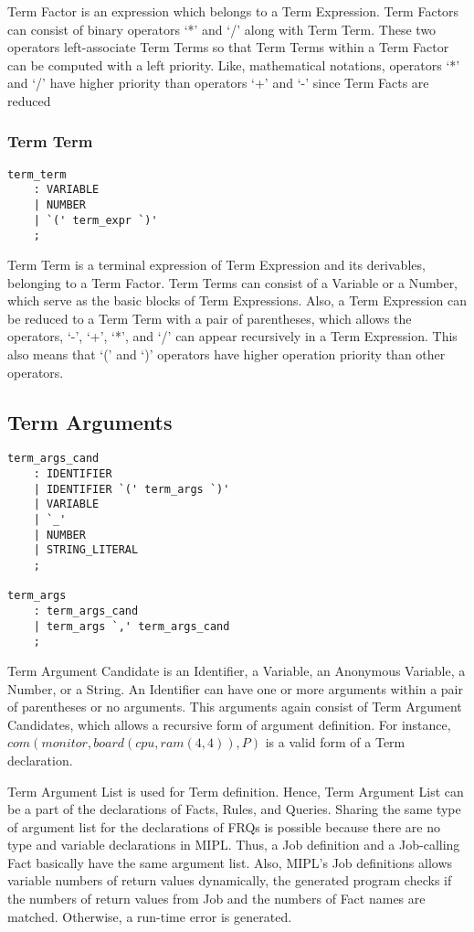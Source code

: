 \documentclass[prodmode,acmtecs]{acmsmall}
\begin{document}
Term Factor is an expression which belongs to a Term Expression.  Term 
Factors can consist of binary operators `*' and `/' along with Term
Term.  These two operators left-associate Term Terms so that Term
Terms within a Term Factor can be computed with a left priority. Like,
mathematical notations, operators `*' and `/' have higher priority than
operators `+' and `-' since Term Facts are reduced 
\medskip


\subsubsection{Term Term}
\begin{lstlisting}
term_term
	: VARIABLE
	| NUMBER
	| `(' term_expr `)'
	;
\end{lstlisting}

Term Term is a terminal expression of Term Expression and its derivables,
belonging to a Term Factor.  Term Terms can consist of a Variable or a
Number, which serve as the basic blocks of Term Expressions.  Also, a Term
Expression can be reduced to a Term Term with a pair of parentheses, which
allows the operators, `-', `+', `*', and `/' can appear recursively in a
Term Expression.  This also means that `(' and `)' operators have higher
operation priority than other operators.
\medskip

\subsection{Term Arguments}

\begin{lstlisting}
term_args_cand
	: IDENTIFIER
	| IDENTIFIER `(' term_args `)'
	| VARIABLE
	| `_'
	| NUMBER
	| STRING_LITERAL
	;

term_args
	: term_args_cand
	| term_args `,' term_args_cand
	;

\end{lstlisting}

Term Argument Candidate is an Identifier, a Variable, an Anonymous
Variable, a Number, or a String.  An Identifier can have one
or more arguments within a pair of parentheses or no arguments.
This arguments again consist of Term Argument Candidates, which
allows a recursive form of argument definition.  For instance, 
$com(monitor, board(cpu, ram(4, 4)), P)$ is a valid form
of a Term declaration.

Term Argument List is used for Term definition. Hence, Term
Argument List can be a part of the declarations of Facts, Rules,
and Queries.  Sharing the same type of argument list for the
declarations of FRQs is possible because there are no type and
variable declarations in MIPL.  Thus, a Job definition and
a Job-calling Fact basically have the same argument list.
Also, MIPL's Job definitions allows variable numbers of return
values dynamically, the generated program
checks if the numbers of return values from Job and the numbers of
Fact names are matched.  Otherwise, a run-time error is generated.
\medskip
\end{document}
